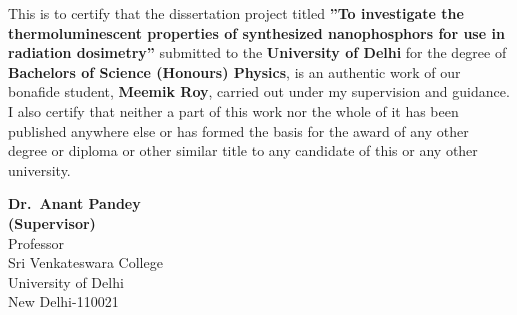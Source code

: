 \documentclass[../Report.tex]{subfiles}
\begin{document}
    \vspace{1cm}
    \large
    This is to certify that the dissertation project titled \textbf{''To investigate the thermoluminescent 
    properties of synthesized nanophosphors for use in radiation dosimetry''}  submitted  to the 
    \textbf{University of Delhi} for the degree of \textbf{Bachelors of Science (Honours) Physics}, 
    is an authentic work of our bonafide student, \textbf{Meemik Roy}, carried out under my supervision and guidance.
    I also certify that neither a part of this work nor the whole of it has been published anywhere else or 
    has formed the basis for the award of any other degree or diploma or other similar title to any candidate 
    of this or any other university.\\
    \vspace*{4.0in}
    \begin{flushleft}
        \textbf{Dr.\ Anant Pandey\\
        (Supervisor)}\\
        \smallskip
        Professor\\
        Sri Venkateswara College\\
        University of Delhi\\
        New Delhi-110021
    \end{flushleft}
\end{document}
